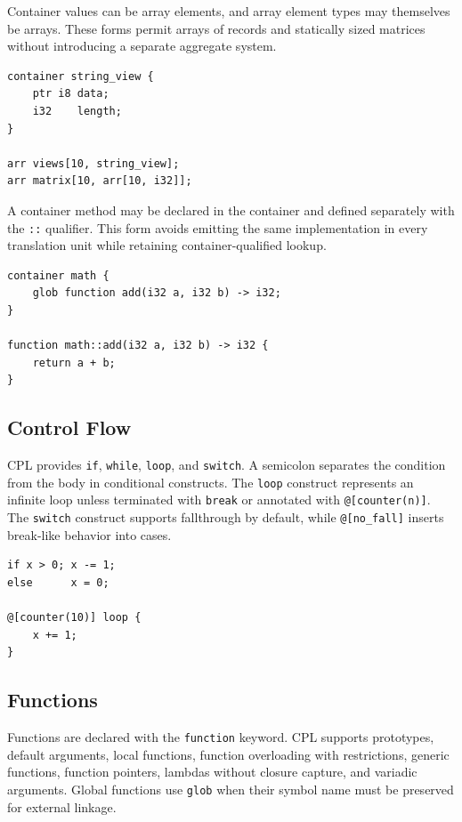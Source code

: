 \documentclass[10pt,twocolumn]{article}
\begin{document}
\par Container values can be array elements, and array element types may themselves be arrays. These forms permit arrays of records and statically sized matrices without introducing a separate aggregate system.

\begin{lstlisting}[language=CPL,caption={Arrays of containers and nested arrays.}]
container string_view {
    ptr i8 data;
    i32    length;
}

arr views[10, string_view];
arr matrix[10, arr[10, i32]];
\end{lstlisting}

\par A container method may be declared in the container and defined separately with the \texttt{::} qualifier. This form avoids emitting the same implementation in every translation unit while retaining container-qualified lookup.

\begin{lstlisting}[language=CPL,caption={Out-of-container method definition.}]
container math {
    glob function add(i32 a, i32 b) -> i32;
}

function math::add(i32 a, i32 b) -> i32 {
    return a + b;
}
\end{lstlisting}

\subsection{Control Flow}
\par CPL provides \texttt{if}, \texttt{while}, \texttt{loop}, and \texttt{switch}. A semicolon separates the condition from the body in conditional constructs. The \texttt{loop} construct represents an infinite loop unless terminated with \texttt{break} or annotated with \texttt{@[counter(n)]}. The \texttt{switch} construct supports fallthrough by default, while \texttt{@[no\_fall]} inserts break-like behavior into cases.

\begin{lstlisting}[language=CPL, caption={Control flow.}]
if x > 0; x -= 1;
else      x = 0;

@[counter(10)] loop {
    x += 1;
}
\end{lstlisting}

\subsection{Functions}
\par Functions are declared with the \texttt{function} keyword. CPL supports prototypes, default arguments, local functions, function overloading with restrictions, generic functions, function pointers, lambdas without closure capture, and variadic arguments. Global functions use \texttt{glob} when their symbol name must be preserved for external linkage.
\end{document}
